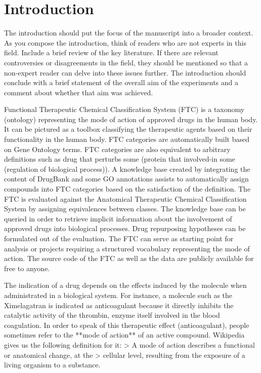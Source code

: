 \documentclass[10pt]{article}
\begin{document}
\section*{Introduction}

The introduction \cite{Krotzsch2012} should put the focus of the manuscript into a broader context. 
As you compose the introduction, think of readers who are not experts in this field. 
Include a brief review of the key literature. If there are relevant controversies or disagreements in 
the field, they should be mentioned so that a non-expert reader can delve into these issues further. 
The introduction should conclude with a brief statement of the overall aim of the experiments and a comment 
about whether that aim was achieved.

Functional Therapeutic Chemical Classification System (FTC) is a taxonomy (ontology) representing the mode of action of approved
drugs in the human body.
It can be pictured as a toolbox classifying the therapeutic agents based on their functionality in the human body.
FTC categories are automatically built based on Gene Ontology terms.
FTC categories are also equivalent to arbitrary definitions such as drug that perturbs some (protein that involved-in some (regulation of 
biological process)).
A knowledge base created by integrating the content of DrugBank and some GO annotations assists to automatically
assign compounds into FTC categories based on the satisfaction of the definition.
The FTC is evaluated against the Anatomical Therapeutic Chemical Classification System by assigning equivalences between classes.
The knowledge base can be queried in order to retrieve implicit information about the involvement of approved drugs into biological
processes.
Drug repurposing hypotheses can be formulated out of the evaluation.
The FTC can serve as starting point for analysis or projects requiring a structured vocabulary representing the mode of action.
The source code of the FTC as well as the data are publicly available for free to anyone.

The indication of a drug depends on the effects induced by the molecule when administrated in a biological system.
For instance, a molecule such as the Ximelagatran is indicated as anticoagulant because
it directly inhibits the catalytic activity of the thrombin, 
enzyme itself involved in the blood coagulation.
In order to speak of this therapeutic effect (anticoagulant), people sometimes refer to 
the **mode of action** of an active compound. 
Wikipedia gives us the following definition for it:
> A mode of action describes a functional or anatomical change, at the 
> cellular level, resulting from the exposure of a living organism to a substance. 
\end{document}
